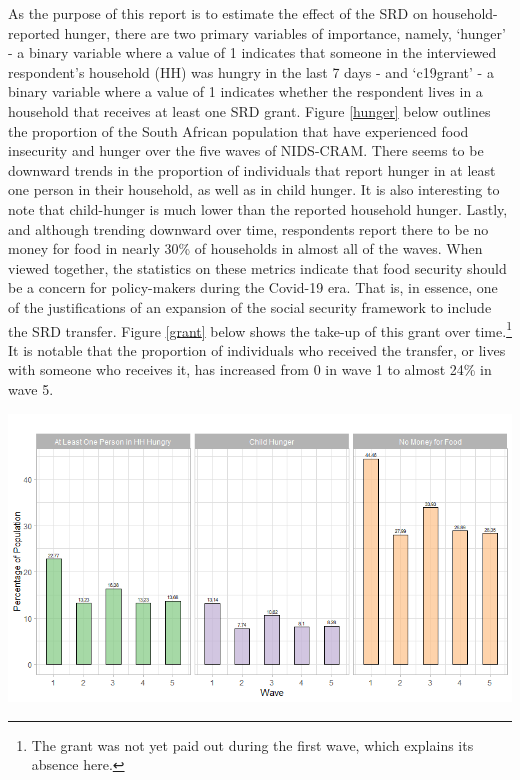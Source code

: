 \documentclass[11pt,preprint, authoryear]{elsarticle}
\let\origfigure\figure
\let\endorigfigure\endfigure
\renewenvironment{figure}[1][2] {
    \expandafter\origfigure\expandafter[H]
} {
    \endorigfigure
}
\numberwithin{equation}{section}
\numberwithin{figure}{section}
\numberwithin{table}{section}
\let\rmarkdownfootnote\footnote%
\def\footnote{\protect\rmarkdownfootnote}
\begin{document}
As the purpose of this report is to estimate the effect of the SRD on
household-reported hunger, there are two primary variables of
importance, namely, `hunger' - a binary variable where a value of 1
indicates that someone in the interviewed respondent's household (HH)
was hungry in the last 7 days - and `c19grant' - a binary variable where
a value of 1 indicates whether the respondent lives in a household that
receives at least one SRD grant. Figure \ref{hunger} below outlines the
proportion of the South African population that have experienced food
insecurity and hunger over the five waves of NIDS-CRAM. There seems to
be downward trends in the proportion of individuals that report hunger
in at least one person in their household, as well as in child hunger.
It is also interesting to note that child-hunger is much lower than the
reported household hunger. Lastly, and although trending downward over
time, respondents report there to be no money for food in nearly 30\% of
households in almost all of the waves. When viewed together, the
statistics on these metrics indicate that food security should be a
concern for policy-makers during the Covid-19 era. That is, in essence,
one of the justifications of an expansion of the social security
framework to include the SRD transfer. Figure \ref{grant} below shows
the take-up of this grant over time.\footnote{The grant was not yet paid
  out during the first wave, which explains its absence here.} It is
notable that the proportion of individuals who received the transfer, or
lives with someone who receives it, has increased from 0 in wave 1 to
almost 24\% in wave 5.

\begin{figure}[H]
\includegraphics[width=1\linewidth]{figures/hunger_descrip} \caption{\label{hunger} Descriptive Statistics on Hunger}\label{fig:hunger}
\end{figure}
\end{document}
